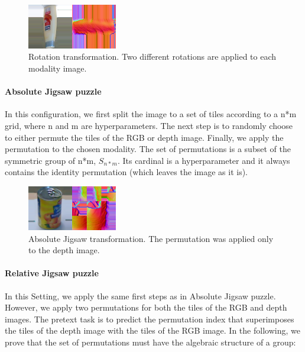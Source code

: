 \documentclass[conference]{IEEEtran}
\begin{document}
\begin{figure}[htbp]
\centerline{\includegraphics[width=0.35\textwidth]{Rotation.png}}
\caption{Rotation transformation. Two different rotations are applied to each modality image.}
\label{fig}
\end{figure}

\paragraph{Absolute Jigsaw puzzle}
In this configuration, we first split the image to a set of tiles according to a n*m grid, where n and m are hyperparameters. The next step is to randomly choose to either permute the tiles of the RGB or depth image. Finally, we apply the permutation to the chosen modality. The set of permutations is a subset of the symmetric group of n*m, $S_{n*m}$. Its cardinal is a hyperparameter and it always contains the identity permutation (which leaves the image as it is).

\begin{figure}[htbp]
\centerline{\includegraphics[width=0.35\textwidth]{absolute.png}}
\caption{Absolute Jigsaw transformation. The permutation was applied only to the depth image.}
\label{fig}
\end{figure}

\paragraph{Relative Jigsaw puzzle}
In this Setting, we apply the same first steps as in Absolute Jigsaw puzzle. However, we apply two permutations for both the tiles of the RGB and depth images. The pretext task is to predict the permutation index that superimposes the tiles of the depth image with the tiles of the RGB image. 
\newpage
In the following, we prove that the set of permutations must have the algebraic structure of a group:
\end{document}
